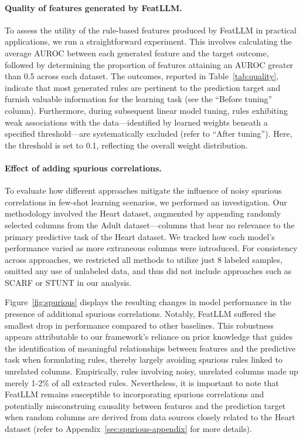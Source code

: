 \vspace*{-0.12in}
\paragraph{Quality of features generated by \textsf{FeatLLM}.}
To assess the utility of the rule-based features produced by \textsf{FeatLLM} in practical applications, we run a straightforward experiment. This involves calculating the average AUROC between each generated feature and the target outcome, followed by determining the proportion of features attaining an AUROC greater than 0.5 across each dataset. The outcomes, reported in Table~\ref{tab:quality}, indicate that most generated rules are pertinent to the prediction target and furnish valuable information for the learning task (see the ``Before tuning'' column). Furthermore, during subsequent linear model tuning, rules exhibiting weak associations with the data—identified by learned weights beneath a specified threshold—are systematically excluded (refer to ``After tuning''). Here, the threshold is set to 0.1, reflecting the overall weight distribution.

\vspace*{-0.12in}
\paragraph{Effect of adding spurious correlations.} To evaluate how different approaches mitigate the influence of noisy spurious correlations in few-shot learning scenarios, we performed an investigation. Our methodology involved the Heart dataset, augmented by appending randomly selected columns from the Adult dataset—columns that bear no relevance to the primary predictive task of the Heart dataset. We tracked how each model's performance varied as more extraneous columns were introduced. For consistency across approaches, we restricted all methods to utilize just 8 labeled samples, omitted any use of unlabeled data, and thus did not include approaches such as SCARF or STUNT in our analysis.

Figure~\ref{fig:spurious} displays the resulting changes in model performance in the presence of additional spurious correlations. Notably, \textsf{FeatLLM} suffered the smallest drop in performance compared to other baselines. This robustness appears attributable to our framework’s reliance on prior knowledge that guides the identification of meaningful relationships between features and the predictive task when formulating rules, thereby largely avoiding spurious rules linked to unrelated columns. Empirically, rules involving noisy, unrelated columns made up merely 1-2\% of all extracted rules. Nevertheless, it is important to note that \textsf{FeatLLM} remains susceptible to incorporating spurious correlations and potentially misconstruing causality between features and the prediction target when random columns are derived from data sources closely related to the Heart dataset (refer to Appendix~\ref{sec:spurious-appendix} for more details).

